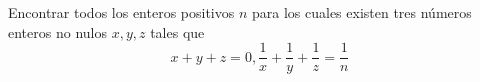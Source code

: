 Encontrar todos los enteros positivos $n$ para los cuales existen tres números enteros no nulos $x,y,z$ tales que
\[ x+y+z=0, \frac{1}{x} + \frac{1}{y} + \frac{1}{z} = \frac{1}{n} \]
